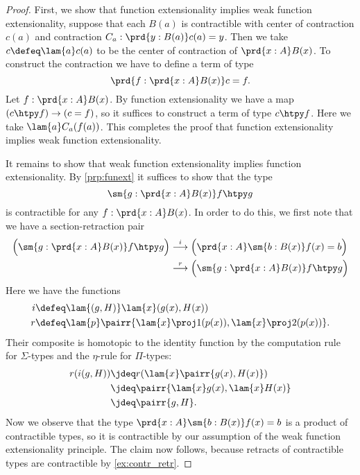 \begin{proof}
  First, we show that function extensionality implies weak function extensionality, suppose that each $B(a)$ is contractible with center of contraction $c(a)$ and contraction $C_a:\prd{y:B(a)}c(a)=y$. Then we take $c\defeq \lam{a}c(a)$ to be the center of contraction of $\prd{x:A}B(x)$. To construct the contraction we have to define a term of type
  \begin{equation*}
    \prd{f:\prd{x:A}B(x)}c=f.
  \end{equation*}
  Let $f:\prd{x:A}B(x)$. By function extensionality we have a map ${(c\htpy f)}\to {(c=f)}$, so it suffices to construct a term of type $c\htpy f$. Here we take $\lam{a}C_a(f(a))$. This completes the proof that function extensionality implies weak function extensionality.
  
  It remains to show that weak function extensionality implies function extensionality. By \cref{prp:funext} it suffices to show that the type
  \begin{equation*}
    \sm{g:\prd{x:A}B(x)}f\htpy g
  \end{equation*}
  is contractible for any $f:\prd{x:A}B(x)$. In order to do this, we first note that we have a section-retraction pair
  \begin{align*}
    \Big(\sm{g:\prd{x:A}B(x)}f\htpy g\Big)
    & \stackrel{i}{\longrightarrow} \Big(\prd{x:A}\sm{b:B(x)}f(x)=b\Big) \\
    & \stackrel{r}{\longrightarrow} \Big(\sm{g:\prd{x:A}B(x)}f\htpy g\Big)
  \end{align*}
  Here we have the functions
  \begin{align*}
    i & \defeq \lam{(g,H)}\lam{x}(g(x),H(x)) \\
    r & \defeq \lam{p}\pairr{\lam{x}\proj 1(p(x)),\lam{x}\proj 2(p(x))}.
  \end{align*}
  Their composite is homotopic to the identity function by the computation rule for $\Sigma$-types and the $\eta$-rule for $\Pi$-types:
  \begin{align*}
    r(i(g,H)) & \jdeq r(\lam{x}\pairr{g(x),H(x)}) \\
              & \jdeq \pairr{\lam{x}g(x),\lam{x}H(x)} \\
              & \jdeq \pairr{g,H}.
  \end{align*}
  Now we observe that the type $\prd{x:A}\sm{b:B(x)}f(x)=b$ is a product of contractible types, so it is contractible by our assumption of the weak function extensionality principle. The claim now follows, because retracts of contractible types are contractible by \cref{ex:contr_retr}.
\end{proof}


